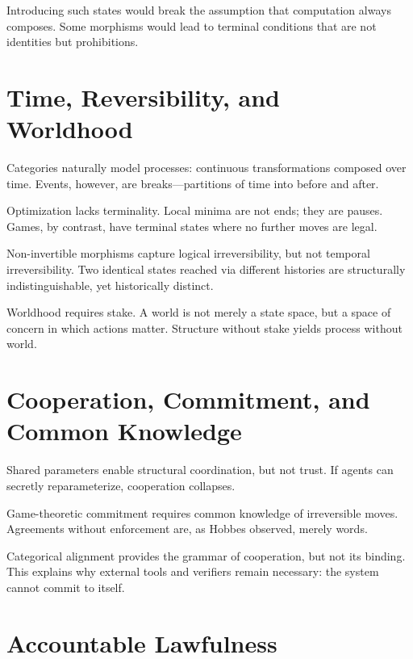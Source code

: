 \documentclass[11pt]{article}
\begin{document}
Introducing such states would break the assumption that computation always
composes. Some morphisms would lead to terminal conditions that are not identities
but prohibitions.

\section{Time, Reversibility, and Worldhood}

Categories naturally model processes: continuous transformations composed over
time. Events, however, are breaks—partitions of time into before and after.

Optimization lacks terminality. Local minima are not ends; they are pauses.
Games, by contrast, have terminal states where no further moves are legal.

Non-invertible morphisms capture logical irreversibility, but not temporal
irreversibility. Two identical states reached via different histories are
structurally indistinguishable, yet historically distinct.

Worldhood requires stake. A world is not merely a state space, but a space of
concern in which actions matter. Structure without stake yields process without
world.

\section{Cooperation, Commitment, and Common Knowledge}

Shared parameters enable structural coordination, but not trust. If agents can
secretly reparameterize, cooperation collapses.

Game-theoretic commitment requires common knowledge of irreversible moves.
Agreements without enforcement are, as Hobbes observed, merely words.

Categorical alignment provides the grammar of cooperation, but not its binding.
This explains why external tools and verifiers remain necessary: the system
cannot commit to itself.

\section{Accountable Lawfulness}
\end{document}
